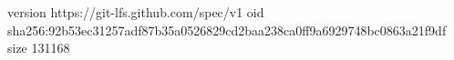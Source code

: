 version https://git-lfs.github.com/spec/v1
oid sha256:92b53ec31257adf87b35a0526829cd2baa238ca0ff9a6929748bc0863a21f9df
size 131168
